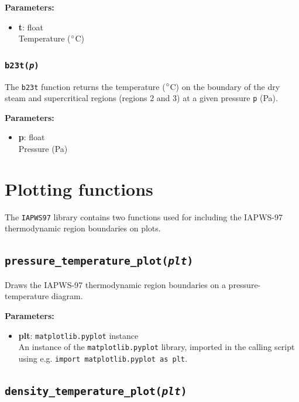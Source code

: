 \textbf{Parameters:}
\begin{itemize}
\item \textbf{t}: float\\
  Temperature ($\degree$C)
\end{itemize}

\begin{snugshade}
\subsubsection{\texttt{b23t(\emph{p})}}
\end{snugshade}
\label{sec:iapws97:b23t}

The \texttt{b23t} function returns the temperature ($\degree$C) on the boundary of the dry steam and supercritical regions (regions 2 and 3) at a given pressure \texttt{p} (Pa).

\textbf{Parameters:}
\begin{itemize}
\item \textbf{p}: float\\
  Pressure (Pa)
\end{itemize}

\section{Plotting functions}

The \texttt{IAPWS97} library contains two functions used for including the IAPWS-97 thermodynamic region boundaries on plots.

\begin{snugshade}
\subsection{\texttt{pressure\_temperature\_plot(\emph{plt})}}
\end{snugshade}
\label{sec:iapws97:pressure_temperature_plot}

Draws the IAPWS-97 thermodynamic region boundaries on a pressure-temperature diagram.

\textbf{Parameters:}
\begin{itemize}
\item \textbf{plt}: \texttt{matplotlib.pyplot} instance\\
  An instance of the \texttt{matplotlib.pyplot} library, imported in the calling script using e.g. \texttt{import matplotlib.pyplot as plt}.
\end{itemize}

\begin{snugshade}
\subsection{\texttt{density\_temperature\_plot(\emph{plt})}}
\end{snugshade}
\label{sec:iapws97:density_temperature_plot}

